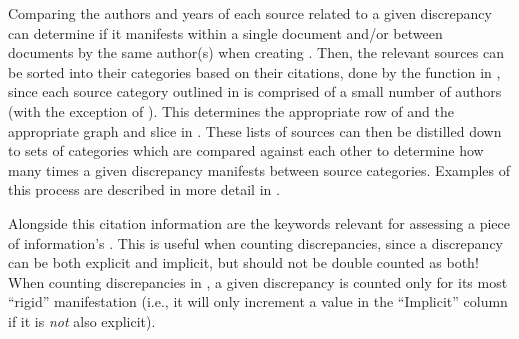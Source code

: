 Comparing the authors and years of each source related to a given discrepancy
can determine if it manifests within a single document and/or between documents
by the same author(s) when creating . Then, the
relevant sources can be sorted into their categories based on their citations,
done by the function in , since each source category
outlined in  is comprised of a small number of authors (with the
exception of \papers{}).
This determines the appropriate row of  and the appropriate
graph and slice in . These lists of sources can then
be distilled down to sets of categories which are compared against
each other to determine how many times a given discrepancy manifests between
source categories. Examples of this process are described in more detail in
.

\label{auto-discrep-analysis-rigidity}
Alongside this citation information are the keywords relevant for assessing a
piece of information's . This is useful when counting
discrepancies, since a discrepancy can be both explicit and implicit, but
should not be double counted as both! When counting
discrepancies in , a given discrepancy is counted only for
its most ``rigid'' manifestation (i.e., it will only increment a value in the
``Implicit'' column if it is \emph{not} also explicit).

